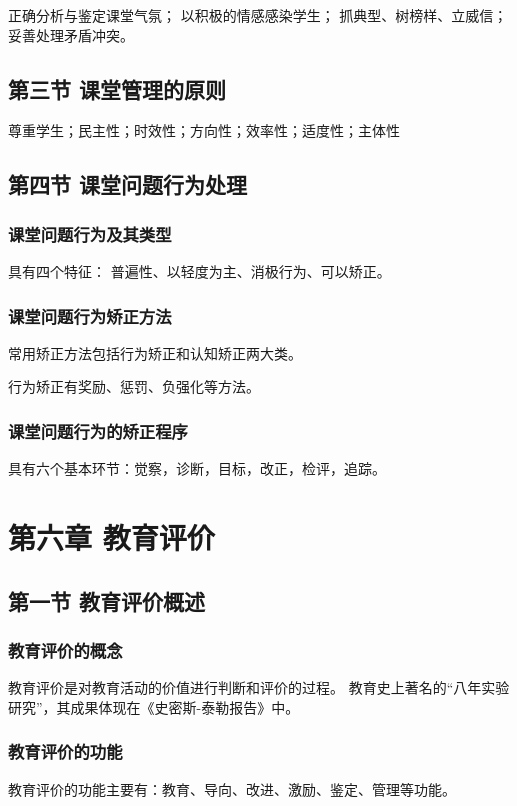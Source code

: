 \documentclass[b5paper,11pt]{article}
\begin{document}
\textcolor{ctp-red}{正确分析与鉴定课堂气氛； 以积极的情感感染学生； 抓典型、树榜样、立威信； 妥善处理矛盾冲突。}

\subsection{第三节 \space 课堂管理的原则}
\noindent
\textcolor{ctp-red}{尊重学生；民主性；时效性；方向性；效率性；适度性；主体性}

\subsection{第四节 \space 课堂问题行为处理}
\subsubsection{课堂问题行为及其类型} 
具有四个特征： \textcolor{ctp-red}{普遍性、以轻度为主、消极行为、可以矫正}。

\subsubsection{课堂问题行为矫正方法}
常用矫正方法包括\textcolor{ctp-red}{行为矫正和认知矫正}两大类。

行为矫正有\textcolor{ctp-red}{奖励、惩罚、负强化}等方法。

\subsubsection{课堂问题行为的矫正程序} 
具有六个基本环节：\textcolor{ctp-red}{觉察，诊断，目标，改正，检评，追踪}。

\section{第六章 \space 教育评价}
\subsection{第一节 \space 教育评价概述}
\subsubsection{教育评价的概念}
\textcolor{ctp-blue}{教育评价是对教育活动的价值进行判断和评价的过程。}
教育史上著名的\textcolor{ctp-red}{“八年实验研究”}，其成果体现在《史密斯-泰勒报告》中。

\subsubsection{教育评价的功能}
\textcolor{ctp-red}{教育评价的功能主要有：教育、导向、改进、激励、鉴定、管理}等功能。
\end{document}
